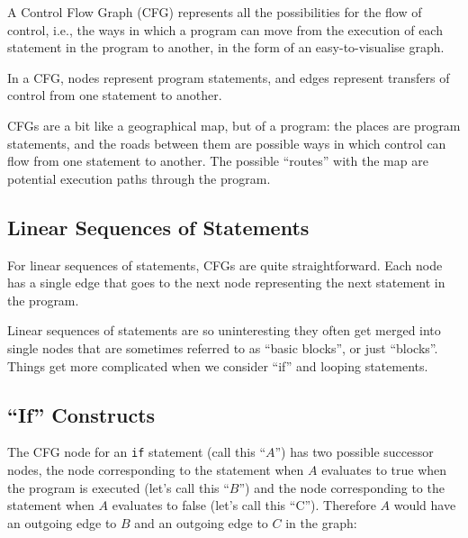 
A Control Flow Graph (CFG) represents all the possibilities for the flow of
control, i.e., the ways in which a program can move from the execution of each
statement in the program to another, in the form of an easy-to-visualise graph. 


In a CFG, nodes represent program statements, and edges represent transfers of
control from one statement to another. 


CFGs are a bit like a geographical map, but of a program: the places are program
statements, and the roads between them are possible ways in which control can
flow from one statement to another. The possible ``routes'' with the map are
potential execution paths through the program.


\subsection{Linear Sequences of Statements}

For linear sequences of statements, CFGs are quite straightforward. Each node
has a single edge that goes to the next node representing the next statement in
the program. 


Linear sequences of statements are so uninteresting they often get merged into
single nodes that are sometimes referred to as ``basic blocks'', or just
``blocks''. Things get more complicated when we consider ``if'' and looping
statements.


\subsection{``If'' Constructs}

The CFG node for an {\tt if} statement (call this ``$A$'') has two possible
successor nodes, the node corresponding to the statement when $A$ evaluates to
true when the program is executed (let's call this ``$B$'') and the node
corresponding to the statement when $A$ evaluates to false (let's call this
``C''). Therefore $A$ would have an outgoing edge to $B$ and an outgoing edge to
$C$ in the graph:


